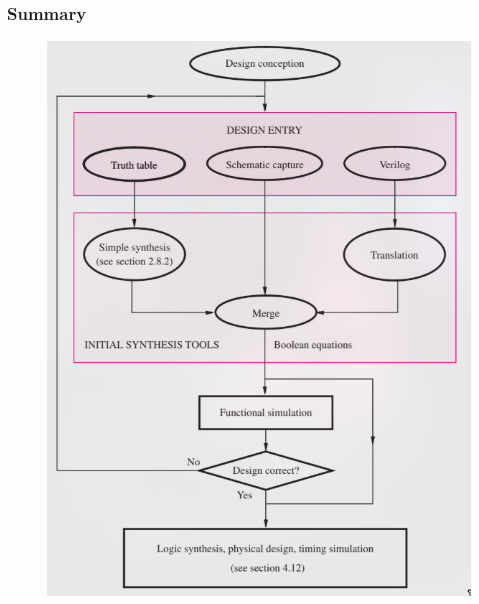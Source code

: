 \documentclass[twocolumn]{article}
\begin{document}
      \subsubsection{Summary}
\begin{figure}[ht!]
            \centering
            \includegraphics[scale=0.4]{flowchart.png}
            \label{stemplot}
          \end{figure} 

\setlength{\parindent}{0pt}
\titleformat{\section}{\large\bfseries}{\thesection}{1em}{}
\titleformat{\subsection}{\bfseries}{\thesubsection}{1em}{}
\maketitle
\end{document}
